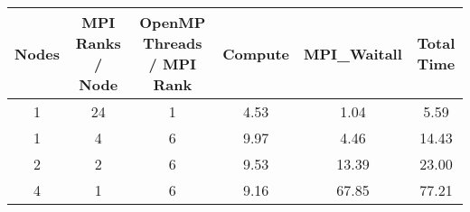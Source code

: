 \begin{tabular}{cccccc}
    \toprule
    Nodes & MPI Ranks / Node & OpenMP Threads / MPI Rank & Compute & MPI\_Waitall & Total Time \\
    \midrule
    1 & 24 & 1 & 4.53 & 1.04 & 5.59       \\
    1 & 4 & 6 & 9.97 & 4.46 & 14.43      \\
    2 & 2 & 6 & 9.53 & 13.39 & 23.00      \\
    4 & 1 & 6 & 9.16 & 67.85 & 77.21      \\
    \bottomrule
\end{tabular}

